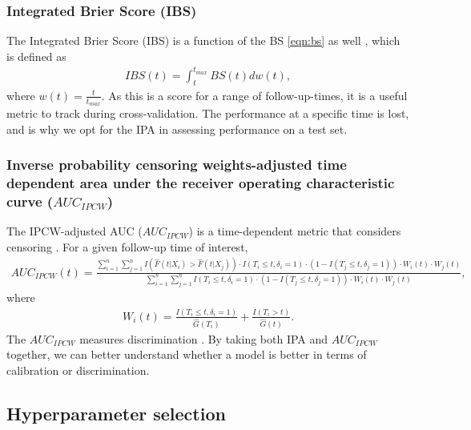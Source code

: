 \documentclass[APA,LATO1COL]{WileyNJD-v2}
\begin{document}
\hypertarget{integrated-brier-score-ibs}{%
\subsubsection{Integrated Brier Score (IBS)}\label{integrated-brier-score-ibs}}

The Integrated Brier Score (IBS) is a function of the BS \ref{eqn:bs} as well \citep{graf1999},
which is defined as \begin{align*}
IBS(t)=\int_{t}^{t_{max}}BS(t)dw(t),
\end{align*} where $w(t)=\frac{t}{t_{max}}$. As this is a score for a range of follow-up-times,
it is a useful metric to track during cross-validation. The performance at a specific time is lost,
and is why we opt for the IPA in assessing performance on a test set.

\hypertarget{auc}{%
\subsubsection{Inverse probability censoring weights-adjusted time dependent area under the receiver operating characteristic curve ($AUC_{IPCW}$) }\label{auc}}

The IPCW-adjusted AUC ($AUC_{IPCW}$) is a time-dependent metric that considers censoring \citep{auc}. 
For a given follow-up time of interest,
 \begin{align*}
AUC_{IPCW}(t)=\frac{\sum^{n}_{i=1}\sum^{n}_{j=1} I \left(\widehat{F}(t|X_{i})>\widehat{F}(t|X_{j})\right) \cdot I(T_{i}\leq t,\delta_{i}=1) \cdot \left( 1-I(T_{j}\leq t,\delta_{j}=1) \right) \cdot W_{i}(t) \cdot W_{j}(t)} { \sum^{n}_{i=1}\sum^{n}_{j=1} I(T_{i}\leq t,\delta_{i}=1) \cdot \left( 1-I(T_{j}\leq t,\delta_{j}=1) \right) \cdot W_{i}(t) \cdot W_{j}(t) },
\end{align*}where \begin{align*}
W_{i}(t)=\frac{I(T_{i}\leq t,\delta_{i}=1)}{\widehat{G}(T_{i})} +\frac{I(T_{i}>t)}{\widehat{G}(t)}.
\end{align*} The $AUC_{IPCW}$ measures discrimination \citep{auc}.
By taking both IPA and $AUC_{IPCW}$ together, we can better understand whether a model is better
in terms of calibration or discrimination.

\hypertarget{hyperparameter-selection}{%
\subsection{Hyperparameter selection}\label{hyperparameter-selection}}
\end{document}

